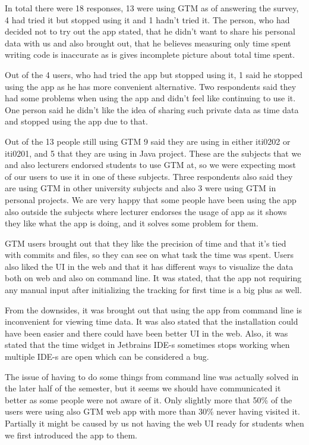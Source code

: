 In total there were 18 responses, 13 were using GTM as of answering the survey, 4 had tried it but stopped using it and 1 hadn't tried it.
The person, who had decided not to try out the app stated, that he didn't want to share his personal data with us and also brought out,
that he believes measuring only time spent writing code is inaccurate as is gives incomplete picture about total time spent.

Out of the 4 users, who had tried the app but stopped using it, 1 said he stopped using the app as he has more convenient alternative.
Two respondents said they had some problems when using the app and didn't feel like continuing to use it.
One person said he didn't like the idea of sharing such private data as time data and stopped using the app due to that.

Out of the 13 people still using GTM 9 said they are using in either iti0202 or iti0201, and 5 that they are using in Java project.
These are the subjects that we and also lecturers endorsed students to use GTM at, so we were expecting most of our
users to use it in one of these subjects.
Three respondents also said they are using GTM in other university subjects and also 3 were using GTM in personal projects.
We are very happy that some people have been using the app also outside the subjects where lecturer endorses the usage of app
as it shows they like what the app is doing, and it solves some problem for them.

GTM users brought out that they like the precision of time and that it's tied with commits and files, so they can see
on what task the time was spent.
Users also liked the UI in the web and that it has different ways to visualize the data both on web and also on command line.
It was stated, that the app not requiring any manual input after initializing the tracking for first time is a big plus as well.

From the downsides, it was brought out that using the app from command line is inconvenient for viewing time data.
It was also stated that the installation could have been easier and there could have been better UI in the web.
Also, it was stated that the time widget in Jetbrains IDE-s sometimes stops working when multiple IDE-s are open
which can be considered a bug.

The issue of having to do some things from command line was actually solved in the later half of the semester, but it seems
we should have communicated it better as some people were not aware of it.
Only slightly more that 50\% of the users were using also GTM web app with more than 30\% never having visited it.
Partially it might be caused by us not having the web UI ready for students when we first introduced the app to them.

